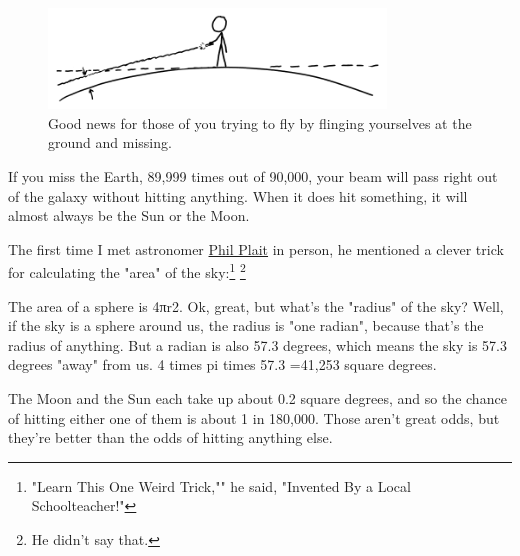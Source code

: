 {\begin{figure}[!htbp]
\centering
\includegraphics[scale=0.5, max width=0.8\textwidth]{imgs/a/109/curve.png}
\caption{Good news for those of you trying to fly by flinging yourselves at the ground and missing.}
\end{figure}

{If you miss the Earth, 89,999 times out of 90,000, your beam will pass right out of the galaxy without hitting anything. When it does hit something, it will almost always be the Sun or the Moon.}

{The first time I met astronomer \href{http://www.slate.com/blogs/bad\_astronomy.html}{Phil Plait} in person, he mentioned a clever trick for calculating the "area" of the sky:{\footnote{"Learn This One Weird Trick,"" he said, "Invented By a Local Schoolteacher!"} } ‌{\footnote{He didn't say that.} } }

{The area of a sphere is 4πr2. Ok, great, but what's the "radius" of the sky? Well, if the sky is a sphere around us, the radius is "one radian", because that's the radius of anything. But a radian is also 57.3 degrees, which means the sky is 57.3 degrees "away" from us. 4 times pi times 57.3 =41,253 square degrees.}

{The Moon and the Sun each take up about 0.2 square degrees, and so the chance of hitting either one of them is about 1 in 180,000. Those aren't great odds, but they're better than the odds of hitting anything else.}

}

